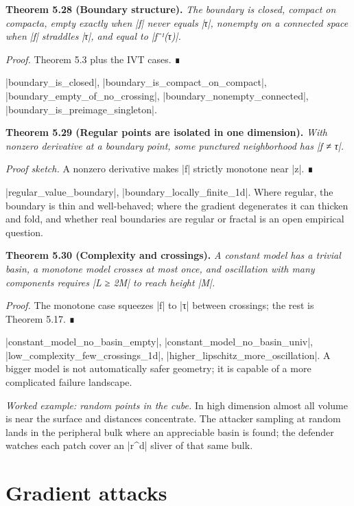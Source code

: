 \documentclass{memoir}
\begin{document}
\textbf{Theorem 5.28 (Boundary structure).} \emph{The boundary is closed, compact on compacta, empty
exactly when \LeanVerb|f| never equals \LeanVerb|τ|, nonempty on a connected space when \LeanVerb|f|
straddles \LeanVerb|τ|, and equal to \LeanVerb|f⁻¹(τ)|.}

\emph{Proof.} Theorem 5.3 plus the IVT cases. ∎

\LeanVerb|boundary_is_closed|, \LeanVerb|boundary_is_compact_on_compact|,
\LeanVerb|boundary_empty_of_no_crossing|, \LeanVerb|boundary_nonempty_connected|,
\LeanVerb|boundary_is_preimage_singleton|.

\textbf{Theorem 5.29 (Regular points are isolated in one dimension).} \emph{With nonzero derivative
at a boundary point, some punctured neighborhood has \LeanVerb|f ≠ τ|.}

\emph{Proof sketch.} A nonzero derivative makes \LeanVerb|f| strictly monotone near \LeanVerb|z|. ∎

\LeanVerb|regular_value_boundary|, \LeanVerb|boundary_locally_finite_1d|. Where regular, the
boundary is thin and well-behaved; where the gradient degenerates it can thicken
and fold, and whether real boundaries are regular or fractal is an open
empirical question.

\textbf{Theorem 5.30 (Complexity and crossings).} \emph{A constant model has a trivial basin, a
monotone model crosses at most once, and oscillation with many components
requires \LeanVerb|L ≥ 2M| to reach height \LeanVerb|M|.}

\emph{Proof.} The monotone case squeezes \LeanVerb|f| to \LeanVerb|τ| between crossings; the rest is
Theorem 5.17. ∎

\LeanVerb|constant_model_no_basin_empty|, \LeanVerb|constant_model_no_basin_univ|,
\LeanVerb|low_complexity_few_crossings_1d|, \LeanVerb|higher_lipschitz_more_oscillation|. A bigger
model is not automatically safer geometry; it is capable of a more complicated
failure landscape.

\emph{Worked example: random points in the cube.} In high dimension almost all volume
is near the surface and distances concentrate. The attacker sampling at random
lands in the peripheral bulk where an appreciable basin is found; the defender
watches each patch cover an \LeanVerb|r^d| sliver of that same bulk.



\section{Gradient attacks}\label{Two--Schemas--of--Impossibility-005F-005F-005F--Machine--Checked--Limits--of--Trustworthy--Machine--Learning-005F-005F-005F--and--Why--They--Tighten--with--Capability----The--Geometry--of--Attacks----Gradient--attacks}
\end{document}

